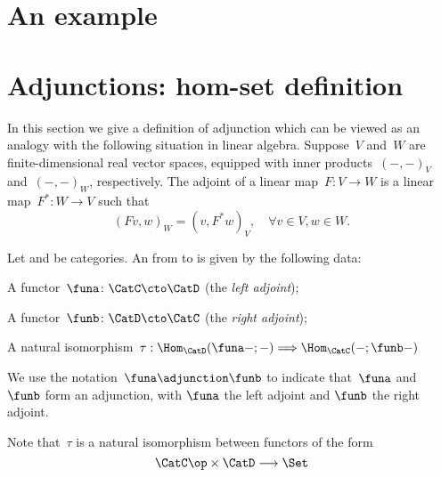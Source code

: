 

\section{An example}



\section{Adjunctions: hom-set definition}
In this section we give a definition of adjunction which can be viewed as an analogy with the following situation in linear algebra. Suppose~$V$ and~$W$ are finite-dimensional real vector spaces, equipped with inner products~$(-, -)_V$ and~$(-, -)_W$, respectively. The adjoint of a linear map~$F\colon V \to W$ is a linear map~$F^*\colon W \rightarrow V$ such that
\begin{equation*}
  (Fv, w)_W = (v, F^*w)_V, \quad \forall v \in V, w \in W.
\end{equation*}

\begin{ctdefinition}
  \label{def:adj-iso}
  \label{def:cat-adjunction-v1}
  Let \CatC and \CatD be categories. An \emph{} from \CatC to \CatD is given by the following data:
  \begin{compactenum}
    \item A functor~$\funa\colon \CatC \cto \CatD$ (the \emph{left adjoint});
    \item A functor~$\funb\colon \CatD \cto \CatC$ (the \emph{right adjoint});
    \item A natural isomorphism~$\tau : \Hom_{\CatD}(\funa - ; - ) \Longrightarrow \Hom_{\CatC}(- ; \funb - )$
  \end{compactenum}
  We use the notation~$\funa \adjunction  \funb$ to indicate that~$\funa$ and~$\funb$ form an adjunction, with $\funa$ the left adjoint and $\funb$ the right adjoint.
\end{ctdefinition}

\begin{remark}
  Note that~$\tau$ is a natural isomorphism between functors of the form
  \begin{equation}
    \CatC\op \times \CatD \longrightarrow \Set
  \end{equation}
\end{remark}




